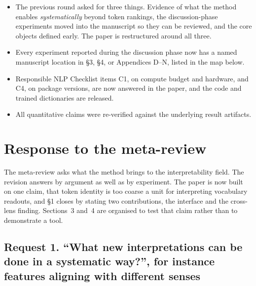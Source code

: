 \documentclass[11pt]{article}
\begin{document}
\begin{itemize}
\item The previous round asked for three things. Evidence of what the method
enables \emph{systematically} beyond token rankings, the discussion-phase
experiments moved into the manuscript so they can be reviewed, and the core
objects defined early. The paper is restructured around all three.
\item Every experiment reported during the discussion phase now has a named
manuscript location in \S3, \S4, or Appendices D--N, listed in the map
below.
\item Responsible NLP Checklist items C1, on compute budget and hardware, and
C4, on package versions, are now answered in the paper, and the code and
trained dictionaries are released.
\item All quantitative claims were re-verified against the underlying result
artifacts.
\end{itemize}

\section{Response to the meta-review}

The meta-review asks what the method brings to the interpretability field.
The revision answers by argument as well as by experiment. The paper is now
built on one claim, that token identity is too coarse a unit for interpreting
vocabulary readouts, and \S1 closes by stating two contributions, the
interface and the cross-lens finding. Sections~3 and~4 are organised to test that claim
rather than to demonstrate a tool.

\subsection*{Request 1. ``What new interpretations can be done in a
systematic way?'', for instance features aligning with different senses}
\end{document}

